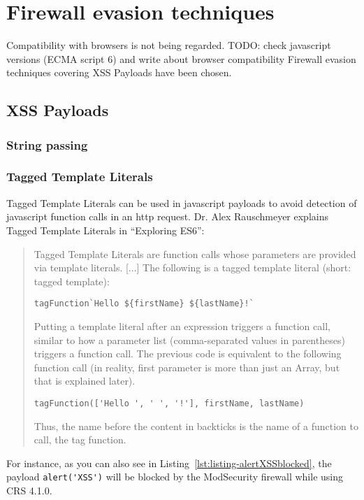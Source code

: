 \section{Firewall evasion techniques}

Compatibility with browsers is not being regarded. {\color{red} TODO: check javascript versions (ECMA script 6) and write about browser compatibility}
Firewall evasion techniques covering XSS Payloads have been chosen.

\subsection{XSS Payloads}

\subsubsection{String passing}

\subsubsection{Tagged Template Literals}
Tagged Template Literals can be used in javascript payloads to avoid detection of javascript function calls in an http request. Dr. Alex Rauschmeyer explains Tagged Template Literals in ``Exploring ES6'':
\begin{quotation} Tagged Template Literals are function calls whose parameters are provided via template literals. [...]
	The following is a tagged template literal (short: tagged template):
	\begin{lstlisting}
tagFunction`Hello ${firstName} ${lastName}!`
\end{lstlisting}
	Putting a template literal after an expression triggers a function call, similar to how a parameter list (comma-separated values in parentheses) triggers a function call. The previous code is equivalent to the following function call (in reality, first parameter is more than just an Array, but that is explained later).
	\begin{lstlisting}
tagFunction(['Hello ', ' ', '!'], firstName, lastName)
\end{lstlisting}
	Thus, the name before the content in backticks is the name of a function to call, the tag function.
	\cite{exploringes6/templatelit}
\end{quotation}

For instance, as you can also see in Listing~\ref{lst:listing-alertXSSblocked}, the payload \verb|alert('XSS')| will be blocked by the ModSecurity firewall while using CRS 4.1.0.

